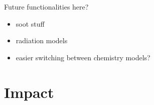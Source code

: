 \documentclass[preprint,12pt, a4paper]{elsarticle}
\begin{document}
Future functionalities here?
\begin{itemize}
	\item soot stuff
	\item radiation models
	\item easier switching between chemistry models?
\end{itemize}



\section{Impact}
\label{sec:impact}
\end{document}
